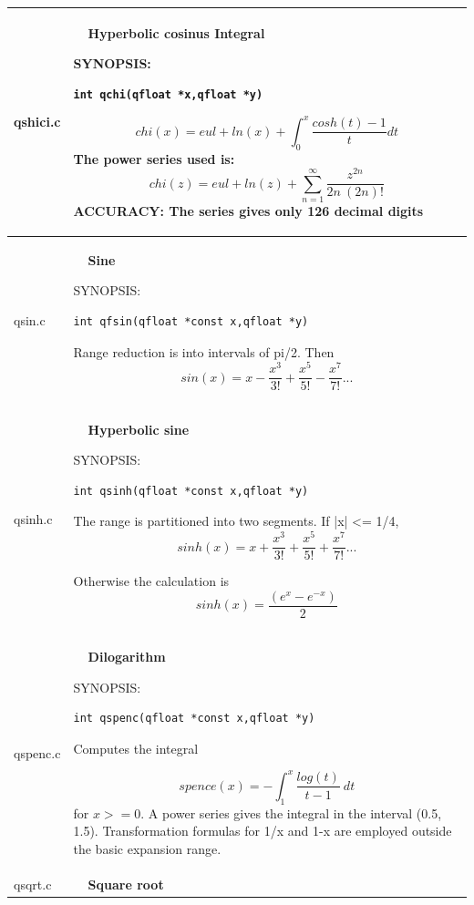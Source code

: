 \documentclass[10pt,a4paper,x11names]{memoir} %
\newcounter{entry}
\newcommand{\TOC}[1] {\addcontentsline{toc}{section}{\theentry\ \  #1} \textbf{\theentry\ \  #1} \par\stepcounter{entry}}
\begin{document}
\begin{longtable}{|p{1.5cm}|p{11.5cm}|}
	qshici.c & \TOC{Hyperbolic cosinus Integral}
	
	{\footnotesize SYNOPSIS:}\vspace{-0.2cm}\index{qchi}
	\begin{lstlisting}[numbers=none]
		int qchi(qfloat *x,qfloat *y)
	\end{lstlisting}\vspace{-0.2cm}
	$$chi(x)=eul + ln(x) + \int_{0}^{x} \frac{cosh(t)-1}{t} dt$$
	The power series used is:
	$$ chi(z)=eul+ln(z)+\sum_{n=1}^{\infty}\frac{z^{2n}}{2n \ (2n)!}$$
	{\footnotesize ACCURACY:} The series gives only 126 decimal digits
	\\\hline
	qsin.c & \TOC{Sine}
	
	{\footnotesize SYNOPSIS:}\vspace{-0.2cm}\index{qfsin}
	\begin{lstlisting}[numbers=none]
		int qfsin(qfloat *const x,qfloat *y)
	\end{lstlisting}\vspace{-0.2cm}
	
	Range reduction is into intervals of pi/2.
	Then
	$$ sin(x) = x - \frac{x^3}{3!}+\frac{x^5}{5!}-\frac{x^7}{7!} ...$$
	\\\hline
	
	qsinh.c& \TOC{Hyperbolic sine}
	
	{\footnotesize SYNOPSIS:}\vspace{-0.2cm}\index{qsinh}
	\begin{lstlisting}[numbers=none]
		int qsinh(qfloat *const x,qfloat *y)
	\end{lstlisting}\vspace{-0.2cm}
	The range is partitioned into two segments.  If |x| <= 1/4,
	$$ sinh(x)=x+\frac{x^3}{3!}+\frac{x^5}{5!}+\frac{x^7}{7!} ...$$
	
	Otherwise the calculation is $$sinh(x) = \frac{( e^{x} - e^{-x} )}{2}$$
	
	\\\hline
	qspenc.c& \TOC{Dilogarithm}
	
	{\footnotesize SYNOPSIS:}\vspace{-0.2cm}\index{qspenc}
	\begin{lstlisting}[numbers=none]
		int qspenc(qfloat *const x,qfloat *y)
	\end{lstlisting}\vspace{-0.2cm}
	
	Computes the integral
	
	$$ spence(x)= - \int_{1}^{x} \frac{log(t)}{t-1} \ dt$$
	for $x >= 0$.  A power series gives the integral in
	the interval (0.5, 1.5).  Transformation formulas for 1/x
	and 1-x are employed outside the basic expansion range.
	\\\hline
	qsqrt.c& \TOC{Square root}
	

\end{longtable}
\end{document}
